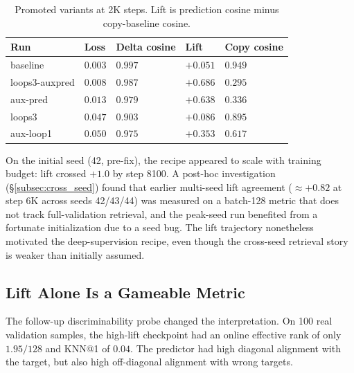 \begin{table}[t]
\centering
\caption{Promoted variants at 2K steps.  Lift is prediction cosine
minus copy-baseline cosine.}
\label{tab:wave2}
\smallskip
\begin{tabular}{lllll}
\toprule
Run & Loss & Delta cosine & Lift & Copy cosine \\
\midrule
\KernelWM{} baseline & $0.003$ & $0.997$ & $+0.051$ & $0.949$ \\
loops3-auxpred & $0.008$ & $0.987$ & $+0.686$ & $0.295$ \\
aux-pred & $0.013$ & $0.979$ & $+0.638$ & $0.336$ \\
loops3 & $0.047$ & $0.903$ & $+0.086$ & $0.895$ \\
aux-loop1 & $0.050$ & $0.975$ & $+0.353$ & $0.617$ \\
\bottomrule
\end{tabular}
\end{table}

On the initial seed (42, pre-fix), the recipe appeared to scale with
training budget: lift crossed $+1.0$ by step 8100.  A post-hoc
investigation (\S\ref{subsec:cross_seed}) found that earlier
multi-seed lift agreement ($\approx +0.82$ at step 6K across seeds
42/43/44) was measured on a batch-128 metric that does not track
full-validation retrieval, and the peak-seed run benefited from a
fortunate initialization due to a seed bug.  The lift trajectory
nonetheless motivated the deep-supervision recipe, even though
the cross-seed retrieval story is weaker than initially assumed.

\subsection{Lift Alone Is a Gameable Metric}
\label{subsec:gameable}

The follow-up discriminability probe changed the interpretation.  On 100
real validation samples, the high-lift  checkpoint
had an online effective rank of only $1.95/128$ and KNN@1 of $0.04$.
The predictor had high diagonal alignment with the target, but also high
off-diagonal alignment with wrong targets.

